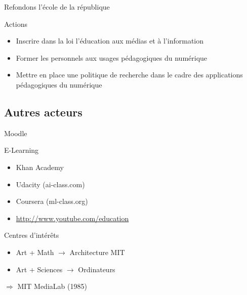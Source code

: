 \begin{frame}{Refondons l'école de la république}
\begin{block}{Actions}
\begin{itemize}
  \item Inscrire dans la loi l’éducation aux médias et à l’information 
  \item Former les personnels aux usages pédagogiques du numérique
  \item Mettre en place une politique de recherche dans le cadre des applications
pédagogiques du numérique
\end{itemize} 
\end{block}


\end{frame}

\subsection{Autres acteurs}

\begin{frame}{Moodle}
\end{frame}

\begin{frame}{E-Learning}

\begin{itemize}
\item Khan Academy
\item Udacity (ai-class.com)
\item Coursera (ml-class.org)
\item \url{http://www.youtube.com/education}
\end{itemize}

\end{frame}

\begin{frame}
   \pause
   \begin{block}{Centres d'intérêts}
     \begin{itemize}
       \item Art + Math $\rightarrow$ Architecture MIT
       \item Art + Sciences $\rightarrow$ Ordinateurs
     \end{itemize}
     $\Rightarrow$ MIT MediaLab (1985)
   \end{block}
\end{frame}

